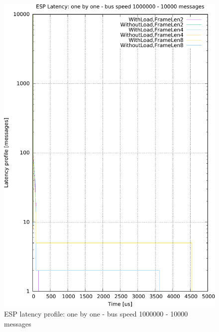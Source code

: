 \documentclass{ctuthesis}
\begin{document}
\begin{figure}[htb]
\includegraphics[width=\linewidth]{figures/speed1000000_messages10000_floodFalse.pdf}
\caption{ESP latency profile: one by one - bus speed 1000000 - 10000 messages}
\end{figure}
\end{document}
